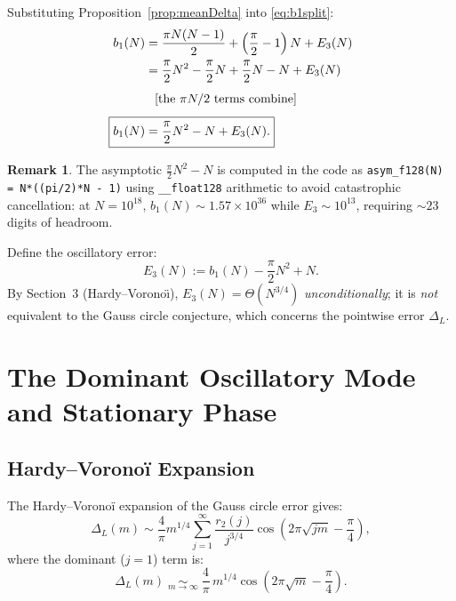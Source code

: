 \documentclass[12pt]{article}
\theoremstyle{definition}
\newtheorem{remark}[theorem]{Remark}
\begin{document}
Substituting Proposition~\ref{prop:meanDelta} into \eqref{eq:b1split}:
\begin{align}
    b_1(N)
    &= \frac{\pi N(N-1)}{2} + \left(\frac{\pi}{2}-1\right)N + E_3(N) \notag\\
    &= \frac{\pi}{2}N^2 - \frac{\pi}{2}N + \frac{\pi}{2}N - N + E_3(N) \notag\\[4pt]
    &\phantom{=}\text{[the $\pi N/2$ terms combine]}\\[4pt]
    \Aboxed{b_1(N) &= \frac{\pi}{2}N^2 - N + E_3(N).}
    \label{eq:b1asym}
\end{align}

\begin{remark}
The asymptotic $\frac{\pi}{2}N^2 - N$ is computed in the code as
\texttt{asym\_f128(N) = N*((pi/2)*N - 1)} using \texttt{\_\_float128}
arithmetic to avoid catastrophic cancellation: at $N = 10^{18}$,
$b_1(N) \sim 1.57\times 10^{36}$ while $E_3 \sim 10^{13}$,
requiring $\sim 23$ digits of headroom.
\end{remark}

Define the oscillatory error:
\begin{equation}
    E_3(N) := b_1(N) - \frac{\pi}{2}N^2 + N.
    \label{eq:E3def}
\end{equation}
By Section~3 (Hardy--Vorono\"\i{}), $E_3(N)=\Theta(N^{3/4})$ \emph{unconditionally}; it is
\emph{not} equivalent to the Gauss circle conjecture, which concerns the pointwise error $\Delta_L$.

\section{The Dominant Oscillatory Mode and Stationary Phase}
\label{sec:stationary}

\subsection{Hardy--Voronoï Expansion}

The Hardy--Voronoï expansion of the Gauss circle error gives:
\begin{equation}
    \Delta_L(m) \sim \frac{4}{\pi} m^{1/4}
    \sum_{j=1}^{\infty} \frac{r_2(j)}{j^{3/4}}
    \cos\!\left(2\pi\sqrt{jm} - \frac{\pi}{4}\right),
    \label{eq:HV}
\end{equation}
where the dominant ($j=1$) term is:
\begin{equation}
    \Delta_L(m) \;\underset{m\to\infty}{\sim}\;
    \frac{4}{\pi}\,m^{1/4}\cos\!\left(2\pi\sqrt{m}-\frac{\pi}{4}\right).
    \label{eq:dominant}
\end{equation}
\end{document}
